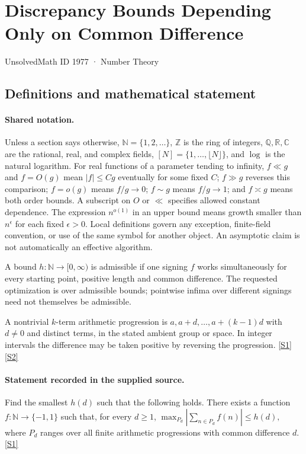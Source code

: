 \documentclass[11pt,a4paper]{article}
\newcommand{\N}{\mathbb{N}}
\newcommand{\Z}{\mathbb{Z}}
\newcommand{\Q}{\mathbb{Q}}
\newcommand{\R}{\mathbb{R}}
\newcommand{\C}{\mathbb{C}}
\newcommand{\sref}[2]{\hyperlink{source:#1:#2}{[S#2]}}
\begin{document}

\setcounter{section}{1976}

\section{Discrepancy Bounds Depending Only on Common Difference}\label{1977}

{\small\sffamily UnsolvedMath ID 1977 · Number Theory}

\subsection{Definitions and mathematical statement}

\paragraph{Shared notation.}Unless a section says otherwise, $\N=\{1,2,\ldots\}$,
$\Z$ is the ring of integers, $\Q,\R,\C$ are the rational, real, and complex
fields, $[N]=\{1,\ldots,\lfloor N\rfloor\}$, and $\log$ is the natural
logarithm. For real functions of a parameter tending to infinity,
$f\ll g$ and $f=O(g)$ mean $|f|\leq Cg$ eventually for some fixed $C$;
$f\gg g$ reverses this comparison; $f=o(g)$ means $f/g\to0$;
$f\sim g$ means $f/g\to1$; and $f\asymp g$ means both order bounds.
A subscript on $O$ or $\ll$ specifies allowed constant dependence.
The expression $n^{o(1)}$ in an upper bound means growth smaller than
$n^\epsilon$ for each fixed $\epsilon>0$. Local definitions govern any
exception, finite-field convention, or use of the same symbol for another
object. An asymptotic claim is not automatically an effective algorithm.



A bound $h:\N\to[0,\infty)$ is admissible if one signing $f$ works simultaneously for every starting point, positive length and common difference. The requested optimization is over admissible bounds; pointwise infima over different signings need not themselves be admissible.

A nontrivial $k$-term arithmetic progression is $a,a+d,\ldots,a+(k-1)d$ with $d\ne0$ and distinct terms, in the stated ambient group or space. In integer intervals the difference may be taken positive by reversing the progression. \sref{1977}{1} \sref{1977}{2}

\paragraph{Statement recorded in the supplied source.}
Find the smallest $h(d)$ such that the following holds. There exists a function $f:\mathbb{N}\to\{-1,1\}$ such that, for every $d\geq 1$, $ \max_{P_d}\left\lvert \sum_{n\in P_d}f(n)\right\rvert\leq h(d), $ where $P_d$ ranges over all finite arithmetic progressions with common difference $d$. \sref{1977}{1}
\end{document}
